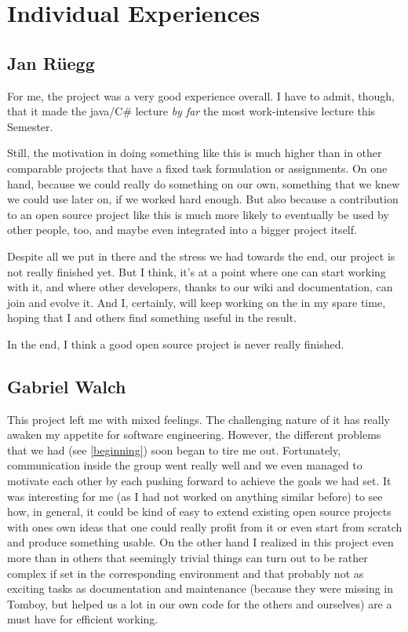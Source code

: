 \section{Individual Experiences}
\label{individual}

\subsection{Jan Rüegg}
\label{individual:jan}
For me, the project was a very good experience overall. I have to admit, though, that it made the java/C\# lecture \textit{by far} the most work-intensive lecture this Semester.

Still, the motivation in doing something like this is much higher than in other comparable projects that have a fixed task formulation or assignments. On one hand, because we could really do something on our own, something that we knew we could use later on, if we worked hard enough. But also because a contribution to an open source project like this is much more likely to eventually be used by other people, too, and maybe even integrated into a bigger project itself.

Despite all we put in there and the stress we had towards the end, our project is not really finished yet. But I think, it's at a point where one can start working with it, and where other developers, thanks to our wiki and documentation, can join and evolve it. And I, certainly, will keep working on the in my spare time, hoping that I and others find something useful in the result.

In the end, I think a good open source project is never really finished.

\subsection{Gabriel Walch}
\label{individual:gabriel}

This project left me with mixed feelings.
The challenging nature of it has really awaken my appetite for software engineering. However, the different problems that we had (see \ref{beginning}) soon began to tire me out.
Fortunately, communication inside the group went really well and we even managed to motivate each other by each pushing forward to achieve the goals we had set.
It was interesting for me (as I had not worked on anything similar before) to see how, in general, it could be kind of easy to extend existing open source projects with ones own ideas that one could really profit from it or even start from scratch and produce something usable.
On the other hand I realized in this project even more than in others that seemingly trivial things can turn out to be rather complex if set in the corresponding environment and that probably not as exciting tasks as documentation and maintenance (because they were missing in Tomboy, but helped us a lot in our own code for the others and ourselves) are a must have for efficient working.


